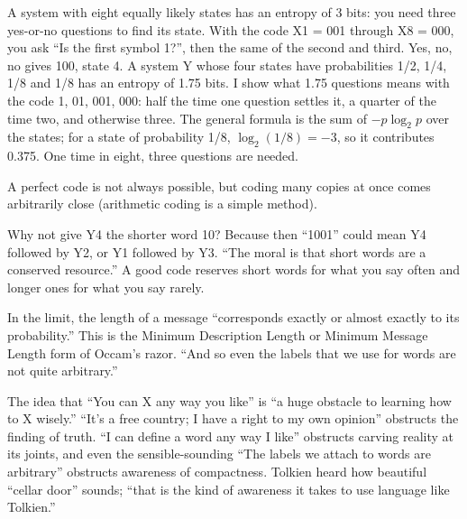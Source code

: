 
A system with eight equally likely states has an entropy of 3 bits: you need three yes-or-no questions to find its state. With the code X1 = 001 through X8 = 000, you ask ``Is the first symbol 1?'', then the same of the second and third. Yes, no, no gives 100, state 4. A system Y whose four states have probabilities 1/2, 1/4, 1/8 and 1/8 has an entropy of 1.75 bits. I show what 1.75 questions means with the code 1, 01, 001, 000: half the time one question settles it, a quarter of the time two, and otherwise three. The general formula is the sum of $-p \log_2 p$ over the states; for a state of probability 1/8, $\log_2(1/8) = -3$, so it contributes 0.375. One time in eight, three questions are needed. 

A perfect code is not always possible, but coding many copies at once comes arbitrarily close (arithmetic coding is a simple method).

Why not give Y4 the shorter word 10? Because then ``1001'' could mean Y4 followed by Y2, or Y1 followed by Y3. ``The moral is that short words are a conserved resource.'' A good code reserves short words for what you say often and longer ones for what you say rarely. 

In the limit, the length of a message ``corresponds exactly or almost exactly to its probability.'' This is the Minimum Description Length or Minimum Message Length form of Occam's razor. ``And so even the labels that we use for words are not quite arbitrary.''  

The idea that ``You can X any way you like'' is ``a huge obstacle to learning how to X wisely.'' ``It's a free country; I have a right to my own opinion'' obstructs the finding of truth. ``I can define a word any way I like'' obstructs carving reality at its joints, and even the sensible-sounding ``The labels we attach to words are arbitrary'' obstructs awareness of compactness. Tolkien heard how beautiful ``cellar door'' sounds; ``that is the kind of awareness it takes to use language like Tolkien.''


